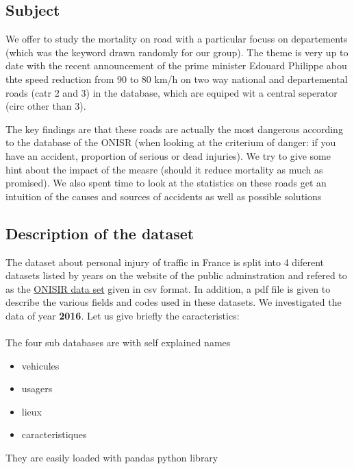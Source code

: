 \documentclass[a4paper]{article}
\begin{document}
\subsection{Subject}
We offer to study the mortality on road with a particular focuss on departements (which was the keyword drawn randomly for our group). The theme is very up to date with the recent announcement of the prime minister Edouard Philippe abou thte speed reduction from 90 to 80 km/h on two way national and departemental roads (catr 2 and 3) in the database, which are equiped wit a central seperator (circ other than 3).

The key findings are that these roads are actually the most dangerous according to the database of the ONISR (when looking at the criterium of danger: if you have an accident, proportion of serious or dead injuries). We try to give some hint about the impact of the measre (should it reduce mortality as much as promised). We also spent time to look at the statistics on these roads get an intuition of the causes and sources of accidents as well as possible solutions

\subsection{Description of the dataset}
The dataset about personal injury of traffic in France is split into 4 diferent datasets listed by years on the website of the public adminstration and refered to as the  \href{https://www.data.gouv.fr/fr/datasets/base-de-donnees-accidents-corporels-de-la-circulation/}{ONISIR data set} given in csv format. In addition, a pdf file is given to describe the various fields and codes used in these datasets. We investigated the data of year \textbf{2016}. Let us give briefly the caracteristics:
\\
\\
The four sub databases are with self explained names
\begin{itemize}
\item vehicules 
\item usagers
\item lieux
\item caracteristiques
\end{itemize}

They are easily loaded with pandas python library


\bigskip

\end{document}

